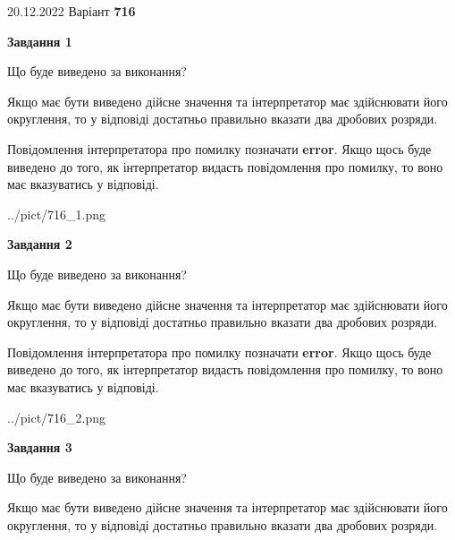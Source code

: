 \documentclass[12pt, ukrainian]{article}
\begin{document}
{20.12.2022 Варіант \No \textbf { 716 }\par}
{
\begin {Large}

{\begin {center}\textbf{Завдання 1}\end {center}}\par
Що буде виведено за виконання? \par

Якщо має бути виведено дійсне значення та інтерпретатор має здійснювати його округлення, 
то у відповіді достатньо правильно вказати два дробових розряди.

Повідомлення інтерпретатора про помилку позначати \textbf{error}.
Якщо щось буде виведено до того, як інтерпретатор видасть повідомлення про помилку, 
то воно має вказуватись у відповіді. \par

\begin{center}
	{../pict/716_1.png}
\end{center}
\newpage

{\begin {center}\textbf{Завдання 2}\end {center}}\par
Що буде виведено за виконання? \par

Якщо має бути виведено дійсне значення та інтерпретатор має здійснювати його округлення, 
то у відповіді достатньо правильно вказати два дробових розряди.

Повідомлення інтерпретатора про помилку позначати \textbf{error}.
Якщо щось буде виведено до того, як інтерпретатор видасть повідомлення про помилку, 
то воно має вказуватись у відповіді. \par

\begin{center}
	{../pict/716_2.png}
\end{center}
\newpage

{\begin {center}\textbf{Завдання 3}\end {center}}\par
Що буде виведено за виконання? \par

Якщо має бути виведено дійсне значення та інтерпретатор має здійснювати його округлення, 
то у відповіді достатньо правильно вказати два дробових розряди.


\end{Large}}
\end{document}
